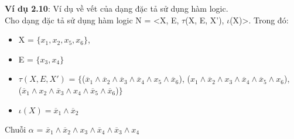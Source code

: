 \documentclass[a4paper,13pt,oneside,openany]{book}
\begin{document}
\begin{flushleft}
		\textbf{Ví dụ 2.10}: Ví dụ về vết của dạng đặc tả sử dụng hàm logic.\\
		Cho dạng đặc tả sử dụng hàm logic N = <X, E, $\tau$(X, E, X'), $\iota$(X)>. Trong đó:\\
		\begin{itemize}
			\item X = $\{x_1, x_2, x_5, x_6\}$,
			\item E = $\{x_3, x_4\}$
			\item $\tau(X, E, X')$ = $\{$($\overline{x}_1 \land \overline{x}_2 \land \overline{x}_3 \land \overline{x}_4 \land x_5 \land \overline{x}_6$), ($x_1\land\overline{x}_2\land x_3\land \overline{x}_4\land \overline{x}_5 \land x_6$),\\
			($\overline{x}_1\land x_2\land\overline{x}_3\land x_4\land \overline{x}_5\land\overline{x}_6$)$\}$
			\item $\iota(X) = \overline{x}_1 \land \overline{x}_2$
		\end{itemize}
		Chuỗi $\alpha$ = $\overline{x}_1 \land \overline{x}_2 \land x_3 \land \overline{x}_4 \land \overline{x}_3 \land x_4$ 

\end{flushleft}
\end{document}
